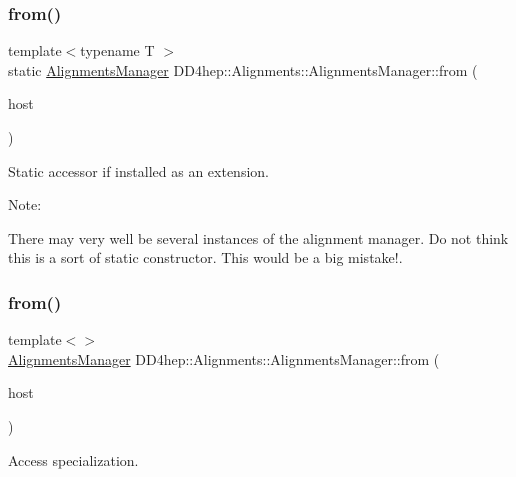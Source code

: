 \subsubsection{\texorpdfstring{from()}{from()}\hspace{0.1cm}{\footnotesize\ttfamily [1/2]}}
{\footnotesize\ttfamily template$<$typename T $>$ \\
static \hyperlink{class_d_d4hep_1_1_alignments_1_1_alignments_manager}{Alignments\+Manager} D\+D4hep\+::\+Alignments\+::\+Alignments\+Manager\+::from (\begin{DoxyParamCaption}\item[{\hyperlink{class_t}{T} \&}]{host }\end{DoxyParamCaption})\hspace{0.3cm}{\ttfamily [static]}}



Static accessor if installed as an extension. 

Note\+:

There may very well be several instances of the alignment manager. Do not think this is a sort of \textquotesingle{}static constructor\textquotesingle{}. This would be a big mistake!. \hypertarget{class_d_d4hep_1_1_alignments_1_1_alignments_manager_a59e0efc65df3f88251b25fe15d07cdb9}{}\label{class_d_d4hep_1_1_alignments_1_1_alignments_manager_a59e0efc65df3f88251b25fe15d07cdb9} 
\subsubsection{\texorpdfstring{from()}{from()}\hspace{0.1cm}{\footnotesize\ttfamily [2/2]}}
{\footnotesize\ttfamily template$<$$>$ \\
\hyperlink{class_d_d4hep_1_1_alignments_1_1_alignments_manager}{Alignments\+Manager} D\+D4hep\+::\+Alignments\+::\+Alignments\+Manager\+::from (\begin{DoxyParamCaption}\item[{\hyperlink{class_d_d4hep_1_1_geometry_1_1_l_c_d_d}{L\+C\+DD} \&}]{host }\end{DoxyParamCaption})}



Access specialization. 



